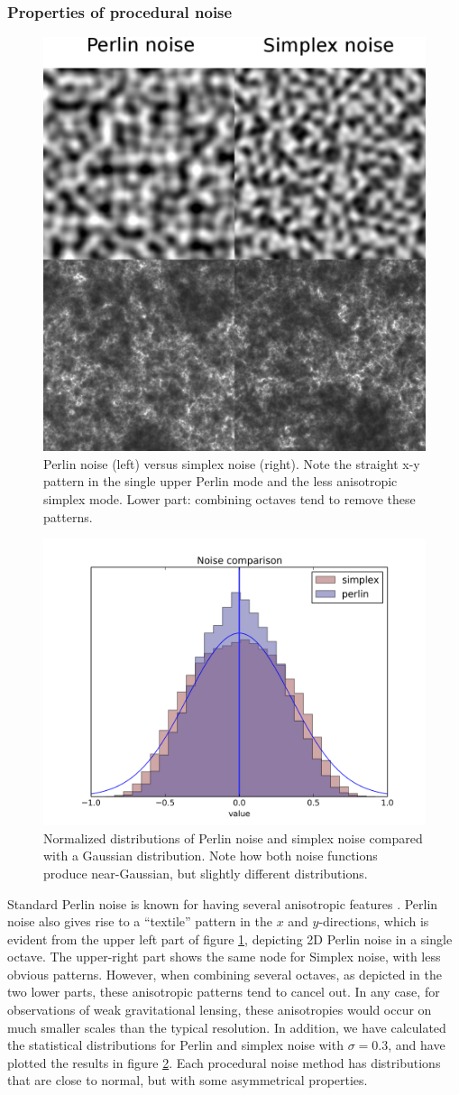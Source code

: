 \documentclass[aps,pre,twocolumn,letterpaper,floatfix,showpacs]{revtex4}
\begin{document}
\subsubsection{Properties of procedural noise}
\begin{figure}
\includegraphics[width=.5\textwidth]{noise.eps}
\caption{Perlin noise (left) versus simplex noise (right). Note the
  straight x-y pattern in the single upper Perlin mode and the less
  anisotropic simplex mode. Lower part: combining octaves tend
  to remove these patterns.}
\label{fig:noise}
\end{figure}

\begin{figure}
\includegraphics[width=.5\textwidth]{noise_comparison.png}
\caption{Normalized distributions of Perlin noise and simplex noise compared with a
  Gaussian distribution. Note how both noise functions produce
  near-Gaussian, but slightly different distributions.}
\label{fig:properties}
\end{figure}
Standard Perlin noise is known for having several anisotropic features
\citep{lagae:2010}. Perlin noise also gives rise to a ``textile''
pattern in the $x$ and $y$-directions, which is evident from the upper
left part of figure \ref{fig:noise}, depicting 2D Perlin noise in
a single octave. The upper-right part shows the same node for Simplex noise,
with less obvious patterns. However, when combining several octaves,
as depicted in the two lower parts, these anisotropic patterns tend to cancel
out. In any case, for observations of weak gravitational lensing, these anisotropies would occur on much smaller 
scales than the typical resolution. 
In addition, we have calculated the statistical distributions for Perlin and simplex noise
with $\sigma = 0.3$, and have plotted the results in figure \ref{fig:properties}.
Each procedural noise method has distributions that are close to normal, 
but with some asymmetrical properties. 
\end{document}
